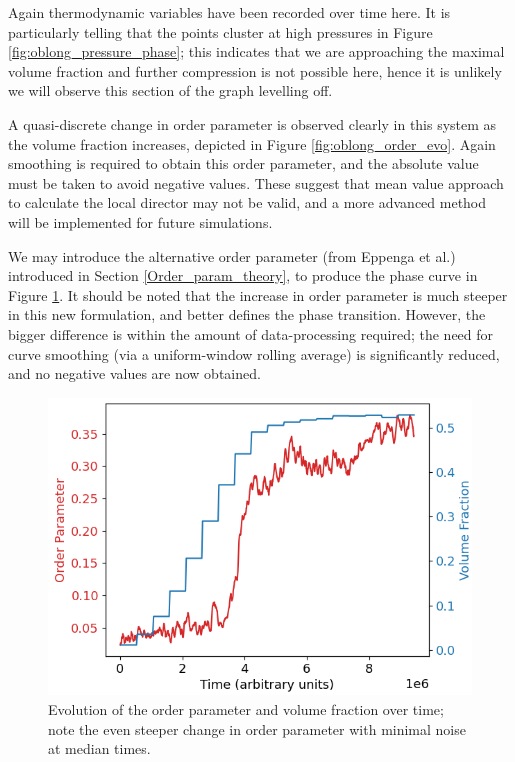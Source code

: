 \documentclass[11pt, a4paper]{article} %
\begin{document}
Again thermodynamic variables have been recorded over time here. It is particularly telling that the points cluster at high pressures in Figure \ref{fig:oblong_pressure_phase}; this indicates that we are approaching the maximal volume fraction and further compression is not possible here, hence it is unlikely we will observe this section of the graph levelling off.

A quasi-discrete change in order parameter is observed clearly in this system as the volume fraction increases, depicted in Figure \ref{fig:oblong_order_evo}. Again smoothing is required to obtain this order parameter, and the absolute value must be taken to avoid negative values. These suggest that mean value approach to calculate the local director may not be valid, and a more advanced method will be implemented for future simulations.

We may introduce the alternative order parameter (from Eppenga et al.) introduced in Section \ref{Order_param_theory}, to produce the phase curve in Figure \ref{fig:oblong_order2}. It should be noted that the increase in order parameter is much steeper in this new formulation, and better defines the phase transition. However, the bigger difference is within the amount of data-processing required; the need for curve smoothing (via a uniform-window rolling average) is significantly reduced, and no negative values are now obtained. 

\begin{figure}
	\centering
	\includegraphics[width=0.7\linewidth]{Figures/order_and_volfrac_oblong2}
	\caption{Evolution of the order parameter and volume fraction over time; note the even steeper change in order parameter with minimal noise at median times.}
	\label{fig:oblong_order2}
\end{figure}


\printbibliography
\end{document}
